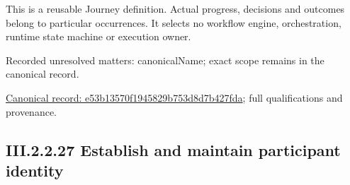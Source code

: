 This is a reusable Journey definition. Actual progress, decisions and outcomes belong to particular occurrences. It selects no workflow engine, orchestration, runtime state machine or execution owner.


{\small Recorded unresolved matters: canonicalName; exact scope remains in the canonical record.}\par
{\footnotesize \href{../../../../../../../continuum/strategy/value-stream/e53b13570f1945829b753d8d7b427fda.md}{Canonical record: e53b13570f1945829b753d8d7b427fda}; full qualifications and provenance.}\par
\subsection*{III.2.2.27 Establish and maintain participant identity}
\label{navigation:III.2.2.27}


